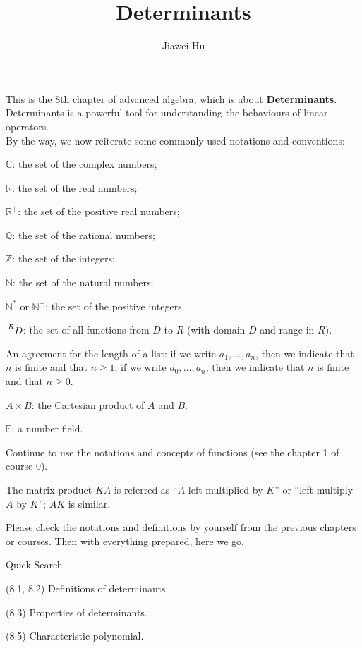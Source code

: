 \documentclass{article}
\title{\LARGE \textbf{Determinants}}
\author{\large Jiawei Hu}
\begin{document}
\maketitle

This is the 8th chapter of advanced algebra, which is about \textbf{Determinants}.\\ 
Determinants is a powerful tool for understanding the behaviours of linear operators.\\
By the way, we now reiterate some commonly-used notations and conventions:
\begin{compactenum}
    \item $\mathbb{C}$: the set of the complex numbers;
    \item $\mathbb{R}$: the set of the real numbers;
    \item $\mathbb{R}^+$: the set of the positive real numbers;
    \item $\mathbb{Q}$: the set of the rational numbers;
    \item $\mathbb{Z}$: the set of the integers;
    \item $\mathbb{N}$: the set of the natural numbers;
    \item $\mathbb{N^\ast}$ or $\mathbb{N}^+$: the set of the positive integers.
    \item $\sideset{^R}{}{\mathop{D}}$: the set of all functions from $D$ to $R$ (with domain $D$ and range in $R$).
    \item An agreement for the length of a list: if we write $a_1, \dots, a_n$, then we indicate that $n$ is finite and that $n\geq 1$; if we write $a_0, \dots, a_n$, then we indicate that $n$ is finite and that $n\geq 0$.
    \item $A\times B$: the Cartesian product of $A$ and $B$.
    \item $\mathbb{F}$: a number field.
    \item Continue to use the notations and concepts of functions (see the chapter 1 of course 0).
    \item The matrix product $KA$ is referred as ``$A$ left-multiplied by $K$'' or ``left-multiply $A$ by $K$''; $AK$ is similar.
\end{compactenum} 
Please check the notations and definitions by yourself from the previous chapters or courses. Then with everything prepared, here we go.

\begin{Th}{Quick Search}
    \begin{compactdesc}
        \item (8.1, 8.2) Definitions of determinants.
        \item (8.3) Properties of determinants.
        \item (8.5) Characteristic polynomial.
    \end{compactdesc}
\end{Th}
\end{document}
